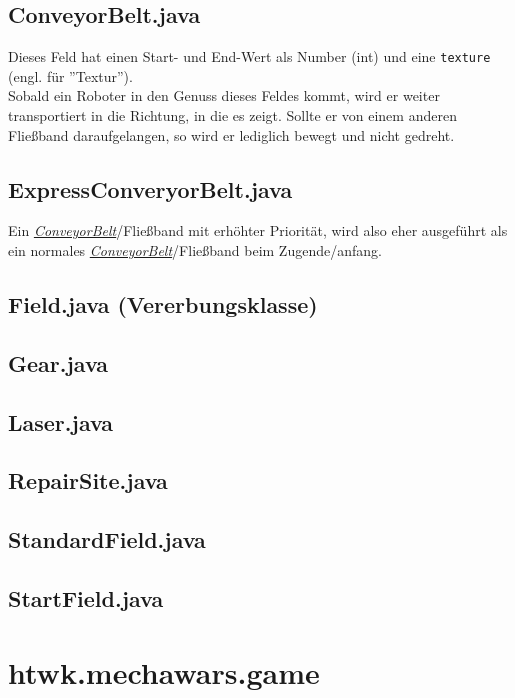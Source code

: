 \documentclass[12pt,a4paper,oneside]{book}
\theoremstyle{plain}
\numberwithin{equation}{chapter} \DeclareMathOperator{\Var}{Var}
\begin{document}
\hypertarget{ConveyorBelt.java}{}    
\subsection{ConveyorBelt.java}
    Dieses Feld hat einen Start- und End-Wert als Number (int) und eine \texttt{texture} (engl. für ''Textur''). \\
    Sobald ein Roboter in den Genuss dieses Feldes kommt, wird er weiter transportiert in die Richtung, in die es zeigt. Sollte er von einem anderen Fließband daraufgelangen, so wird er lediglich bewegt und nicht gedreht.
    
\subsection{ExpressConveryorBelt.java}
    Ein \hyperlink{ConveyorBelt.java}{\textit{ConveyorBelt}}/Fließband mit erhöhter Priorität, wird also eher ausgeführt als ein normales \hyperlink{ConveyorBelt.java}{\textit{ConveyorBelt}}/Fließband beim Zugende/anfang.
    
\hypertarget{Field.java}{}
\subsection{Field.java (Vererbungsklasse)}
    

\subsection{Gear.java}
\subsection{Laser.java}
\subsection{RepairSite.java}
\subsection{StandardField.java}
\subsection{StartField.java}

\newpage
\section{htwk.mechawars.game}
\end{document}
